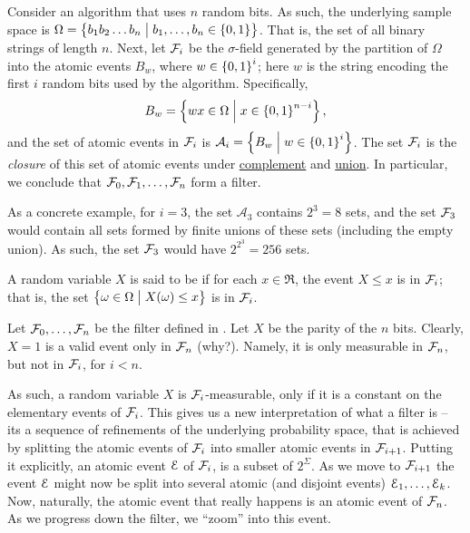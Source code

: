 \begin{example}
    Consider an algorithm \Alg that uses $n$ random bits. As such, the
    underlying sample space is
    $\Omega = \left\{  b_1b_2 \ldots b_n  \;\middle\vert\;  b_1, \ldots, b_n \in
       \left\{ {0,1} \right\}\bigr. \right\}$. That is, the set of all binary strings of
    length $n$.  Next, let $\mathcal{F}_i$ be the $\sigma$-field generated
    by the partition of $\Omega$ into the atomic events $B_w$, where
    $w \in \left\{ {0,1} \right\}^{i}$; here $w$ is the string encoding the first
    $i$ random bits used by the algorithm. Specifically,
    \begin{equation*}
        B_w = \left\{  wx \in \Omega  \;\middle\vert\;  x\in \left\{ {0,1} \right\}^{n-i} \right\},
    \end{equation*}
    and the set of atomic events in $\mathcal{F}_i$ is
    $\mathcal{A}_i = \left\{  B_w  \;\middle\vert\;  w \in \left\{ {0,1} \right\}^i \right\}$. The set
    $\mathcal{F}_i$ is the \emph{closure} of this set of atomic events
    under \underline{complement} and \underline{union}. In particular,
    we conclude that $\mathcal{F}_0, \mathcal{F}_1, \ldots, \mathcal{F}_n$ form a
    filter.

    As a concrete example, for $i=3$, the set $\mathcal{A}_3$ contains
    $2^3=8$ sets, and the set $\mathcal{F}_3$ would contain all sets
    formed by finite unions of these sets (including the empty
    union). As such, the set $\mathcal{F}_3$ would have $2^{2^3} = 256$
    sets.
    
\end{example}

\begin{defn}
    A random variable $X$ is said to be 
    if for each $x \in \Re$, the event $X \leq x$ is in $\mathcal{F}_i$;
    that is, the set
    \begin{math}
        \left\{  \omega \in \Omega  \;\middle\vert\;  \bigl. X(\omega) \leq x \right\}
    \end{math}
    is in $\mathcal{F}_i$.
\end{defn}

\begin{example}
    Let $\mathcal{F}_0, \ldots, \mathcal{F}_n$ be the filter defined in
    . Let $X$ be the parity of the $n$ bits.  Clearly,
    $X=1$ is a valid event only in $\mathcal{F}_n$ (why?).  Namely, it is
    only measurable in $\mathcal{F}_n$, but not in $\mathcal{F}_i$, for $i <
    n$.
\end{example}

As such, a random variable $X$ is $\mathcal{F}_i$-measurable, only if it
is a constant on the elementary events of $\mathcal{F}_i$.  This gives us
a new interpretation of what a filter is -- its a sequence of
refinements of the underlying probability space, that is achieved by
splitting the atomic events of $\mathcal{F}_i$ into smaller atomic events
in $\mathcal{F}_{i+1}$.  Putting it explicitly, an atomic event $\EuScript{E}$
of $\mathcal{F}_i$, is a subset of $2^{\Sigma}$. As we move to
$\mathcal{F}_{i+1}$ the event $\EuScript{E}$ might now be split into several
atomic (and disjoint events) $\EuScript{E}_1, \ldots, \EuScript{E}_k$. Now,
naturally, the atomic event that really happens is an atomic event of
$\mathcal{F}_n$. As we progress down the filter, we ``zoom'' into this
event.




